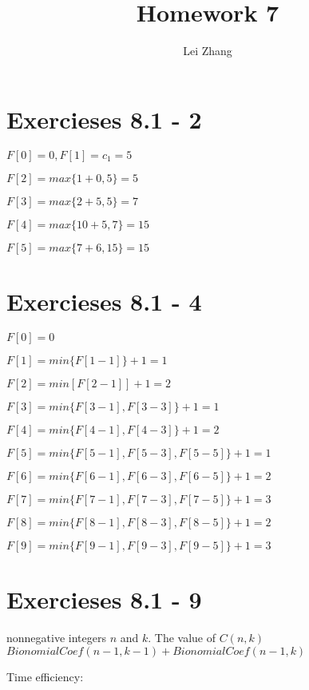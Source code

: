 \documentclass{article}
\title{Homework 7}
\author{Lei Zhang}
\begin{document}
\maketitle

\section{Exercieses 8.1 - 2}

$F[0] = 0, F[1] = c_1 = 5$

$F[2] = max\{1 + 0, 5\} = 5$

$F[3] = max\{2 + 5, 5\} = 7$

$F[4] = max\{10 + 5, 7\} = 15$

$F[5] = max\{7 + 6, 15\} = 15$


\section{Exercieses 8.1 - 4}

$F[0] = 0$

$F[1] = min\{F[1 - 1]\} + 1 = 1$

$F[2] = min[F[2 - 1]] + 1 = 2$

$F[3] = min\{F[3 - 1], F[3 - 3]\} + 1 = 1$

$F[4] = min\{F[4 - 1], F[4 - 3]\} + 1 = 2$

$F[5] = min\{F[5 - 1], F[5 - 3], F[5 - 5]\} + 1 = 1$

$F[6] = min\{F[6 - 1], F[6 - 3], F[6 - 5]\} + 1 = 2$

$F[7] = min\{F[7 - 1], F[7 - 3], F[7 - 5]\} + 1 = 3$

$F[8] = min\{F[8 - 1], F[8 - 3], F[8 - 5]\} + 1 = 2$

$F[9] = min\{F[9 - 1], F[9 - 3], F[9 - 5]\} + 1 = 3$

\section{Exercieses 8.1 - 9}

\begin{center}
\begin{algorithmic}
\INPUT
nonnegative integers $n$ and $k$.
\OUTPUT
The value of $C(n,k)$
\State {}
\Else
\State \Return $BionomialCoef(n-1,k-1) + BionomialCoef(n-1,k)$
\EndIf
\EndFunction
\end{algorithmic}
\end{center}

Time efficiency: 
\end{document}

